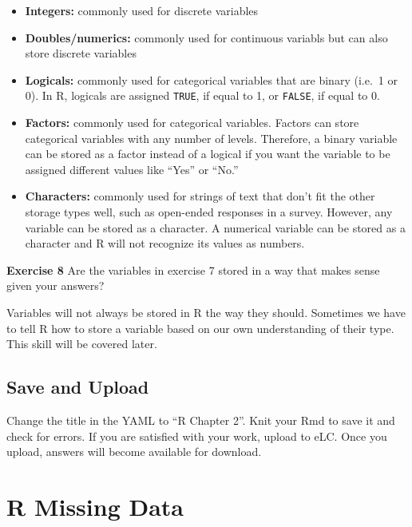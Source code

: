 \documentclass[
]{book}
\providecommand{\tightlist}{%
  \setlength{\itemsep}{0pt}\setlength{\parskip}{0pt}}
\newenvironment{rmdblock}[1]
  {\begin{shaded*}
  }
  {\end{shaded*}
  }
\newenvironment{learncheck}
  {\begin{rmdblock}{warning}}
  {\end{rmdblock}}
\begin{document}
\begin{itemize}
\tightlist
\item
  \textbf{Integers:} commonly used for discrete variables
\item
  \textbf{Doubles/numerics:} commonly used for continuous variabls but can also store discrete variables
\item
  \textbf{Logicals:} commonly used for categorical variables that are binary (i.e.~1 or 0). In R, logicals are assigned \texttt{TRUE}, if equal to 1, or \texttt{FALSE}, if equal to 0.
\item
  \textbf{Factors:} commonly used for categorical variables. Factors can store categorical variables with any number of levels. Therefore, a binary variable can be stored as a factor instead of a logical if you want the variable to be assigned different values like ``Yes'' or ``No.''
\item
  \textbf{Characters:} commonly used for strings of text that don't fit the other storage types well, such as open-ended responses in a survey. However, any variable can be stored as a character. A numerical variable can be stored as a character and R will not recognize its values as numbers.
\end{itemize}

\begin{learncheck}
\textbf{Exercise 8} Are the variables in exercise 7 stored in a way that
makes sense given your answers?
\end{learncheck}

Variables will not always be stored in R the way they should. Sometimes we have to tell R how to store a variable based on our own understanding of their type. This skill will be covered later.

\hypertarget{save-and-upload}{%
\section{Save and Upload}\label{save-and-upload}}

Change the title in the YAML to ``R Chapter 2''. Knit your Rmd to save it and check for errors. If you are satisfied with your work, upload to eLC. Once you upload, answers will become available for download.

\hypertarget{r-missing-data}{%
\chapter{R Missing Data}\label{r-missing-data}}
\end{document}
